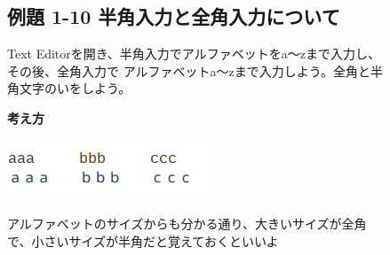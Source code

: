 \clearpage


\begin{figure}
  \subsection{例題 1-10 半角入力と全角入力について}
  Text Editorを開き、半角入力でアルファベットをa〜zまで入力し、その後、全角入力で
  アルファベットa〜zまで入力しよう。全角と半角文字のいをしよう。

  {\bf\large 考え方}

  \centering
  \includegraphics[width=5.978cm]{text01-img/textbook-img066.png}

  \begin{minipage}{16.578cm}
    アルファベットのサイズからも分かる通り、大きいサイズが全角で、小さいサイズが半角だと覚えておくといいよ
  \end{minipage}


\end{figure}
